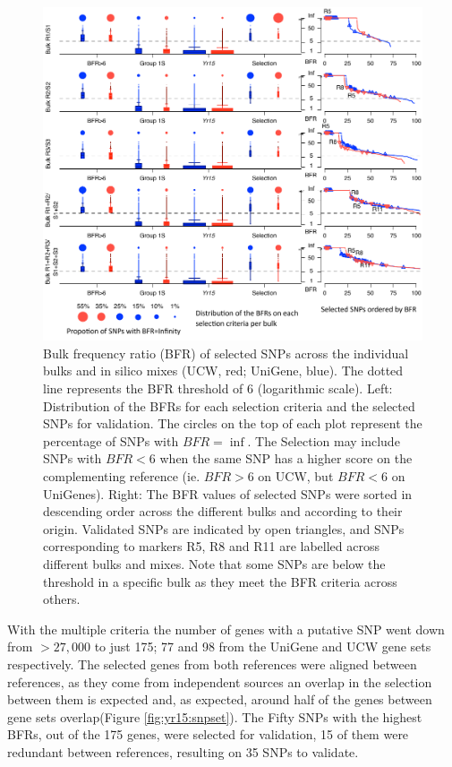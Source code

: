 \begin{figure}
\centering
\includegraphics[width=1\textwidth]{Yr15/Figures/selection/selectionDetals.pdf}
\caption{Bulk frequency ratio (BFR) of selected SNPs across the individual bulks and in silico mixes (UCW, red; UniGene, blue). The dotted line represents the BFR threshold of 6 (logarithmic scale). Left: Distribution of the BFRs for each selection criteria and the selected SNPs for validation. The circles on the top of each plot represent the percentage of SNPs with $BFR=\inf$. The Selection may include SNPs with $BFR<6$ when the same SNP has a higher score on the complementing reference (ie. $BFR>6$ on UCW, but $BFR<6$ on UniGenes). Right: The BFR values of selected SNPs were sorted in descending order across the different bulks and according to their origin. Validated SNPs are indicated by open triangles, and SNPs corresponding to markers R5, R8 and R11 are labelled across different bulks and mixes. Note that some SNPs are below the threshold in a specific bulk as they meet the BFR criteria across others. }
\label{fig:yr15:bfrDetailScore}
\end{figure}

With the multiple criteria the number of genes with a putative SNP went down from $>27,000$ to just 175; 77 and 98 from the UniGene and UCW gene sets respectively. 
The selected genes from both references were aligned between references, as they come from independent sources an overlap in the selection between them is expected and, as expected, around half of the genes between gene sets overlap(Figure \ref{fig:yr15:snpset}). 
The Fifty SNPs with the highest BFRs, out of the 175 genes, were selected for validation, 15 of them were redundant between references, resulting on 35 SNPs to validate. 



